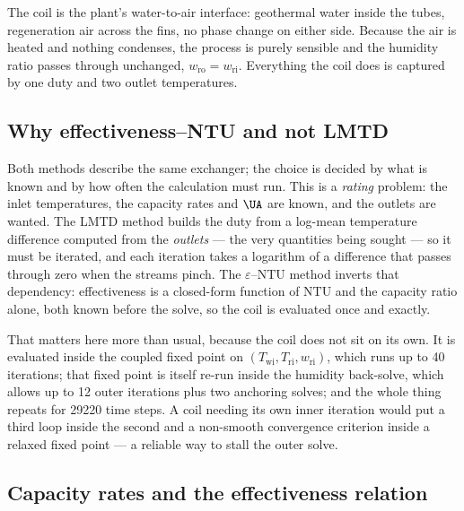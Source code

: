The coil is the plant's water-to-air interface: geothermal water inside the tubes, regeneration
air across the fins, no phase change on either side. Because the air is heated and nothing
condenses, the process is purely sensible and the humidity ratio passes through unchanged,
$w_{\mathrm{ro}}=w_{\mathrm{ri}}$. Everything the coil does is captured by one duty and two
outlet temperatures.

\subsection{Why effectiveness--NTU and not LMTD}
\label{sec:hyd:whyntu}

Both methods describe the same exchanger; the choice is decided by what is known and by how
often the calculation must run. This is a \emph{rating} problem: the inlet temperatures, the
capacity rates and $\UA$ are
known, and the outlets are wanted. The LMTD method builds the duty from a log-mean temperature
difference computed from the \emph{outlets} --- the very quantities being sought --- so it must
be iterated, and each iteration takes a logarithm of a difference that passes through zero when
the streams pinch. The $\varepsilon$--$\mathrm{NTU}$ method inverts that dependency:
effectiveness is a closed-form function of $\mathrm{NTU}$ and the capacity ratio alone, both
known before the solve, so the coil is evaluated once and exactly.

That matters here more than usual, because the coil does not sit on its own. It is evaluated
inside the coupled fixed point on $(T_{\mathrm{wi}},T_{\mathrm{ri}},w_{\mathrm{ri}})$, which
runs up to \num{40} iterations; that fixed point is itself re-run inside the humidity
back-solve, which allows up to \num{12} outer iterations plus two anchoring solves; and the
whole thing repeats for \num{29220} time steps. A coil needing its own inner iteration would
put a third loop inside the second and a non-smooth convergence criterion inside a relaxed
fixed point --- a reliable way to stall the outer solve.

\subsection{Capacity rates and the effectiveness relation}
\label{sec:hyd:coileqs}

